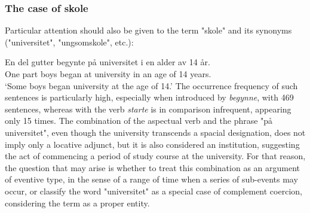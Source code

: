 \documentclass{article}
\begin{document}
\subsubsection{The case of skole}
Particular attention should also be given to the term "skole" and its synonyms ("universitet", "ungsomskole", etc.):
        \ea \label{initiation_skole} %

        \gll En del gutter begynte på universitet i en alder av 14 år.\\
             One part boys began at university in an age of 14 years.\\
        \glt ‘Some boys began university at the age of 14.’
        \z
The occurrence frequency of such sentences is particularly high, especially when introduced by \emph{begynne}, with 469 sentences, whereas with the verb \emph{starte} is in comparison infrequent, appearing only 15 times. 
The combination of the aspectual verb and the phrase "på universitet", even though the university transcends a spacial designation, does not imply only a locative adjunct, but it is also considered an institution, suggesting the act of commencing a period of study course at the university. For that reason, the question that may arise is whether to treat this combination as an argument of eventive type, in the sense of a range of time when a series of sub-events may occur, or classify the word "universitet" as a special case of complement coercion, considering the term as a proper entity.
\end{document}
